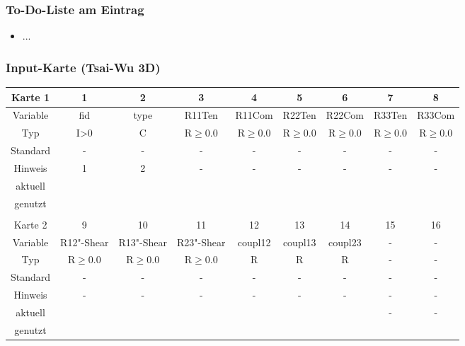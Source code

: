 \documentclass[11pt,titlepage,listof=totoc,bibliography=totoc,twoside]{scrreprt}
\begin{document}
{{\subsubsection{To-Do-Liste am Eintrag}

\begin{itemize}
\item ...
\end{itemize}

\newpage

\subsubsection{Input-Karte (Tsai-Wu 3D)}

\begin{table}[htbp]
\centering
\begin{tabularx}{\textwidth}{cCCCCCCCC}
\toprule
Karte 1	& 1		& 2		& 3		& 4		& 5		& 6		& 7		& 8		\\
\midrule
Variable& fid		& type		& R11Ten	& R11Com	& R22Ten	& R22Com	& R33Ten	& R33Com	\\
Typ	& I>0		& C		& R$\ge$0.0	& R$\ge$0.0	& R$\ge$0.0	& R$\ge$0.0	& R$\ge$0.0	& R$\ge$0.0	\\
Standard& -		& -		& -		& -		& -		& -		& -		& -		\\
Hinweis	& 1		& 2		& -		& -		& -		& -		& -		& -		\\
aktuell	& 	& 	& 	& 	& 	& 	& 	& 	\\
genutzt \\
\\
Karte 2	& 9		& 10		& 11		& 12		& 13		& 14		& 15		& 16		\\
\midrule
Variable& R12"-Shear	& R13"-Shear	& R23"-Shear	& coupl12	& coupl13	& coupl23	& -		& -		\\
Typ	& R$\ge$0.0	& R$\ge$0.0	& R$\ge$0.0	& R		& R		& R		& -		& -		\\
Standard& -		& -		& -		& -		& -		& -		& -		& -		\\
Hinweis	& -		& -		& -		& -		& -		& -		& -		& -		\\
aktuell	& 	& 	& 	& 	& 	& 	& \multirow{2}{*}{-}	& 	\\
genutzt \\
\bottomrule
\end{tabularx}
\end{table}

}}
\end{document}
